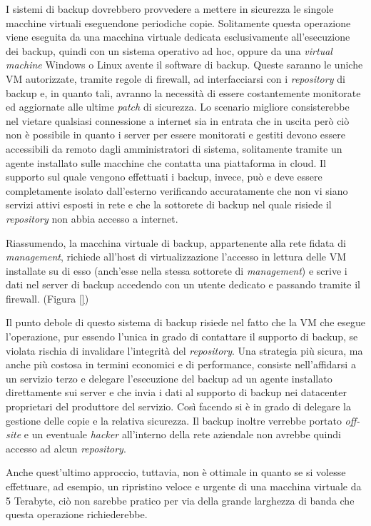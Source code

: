 \documentclass[target=bach,aauheader=]{thud}
\begin{document}
I sistemi di backup dovrebbero provvedere a mettere in sicurezza le singole macchine virtuali eseguendone periodiche copie. Solitamente questa operazione viene eseguita da una macchina virtuale dedicata esclusivamente all'esecuzione dei backup, quindi con un sistema operativo ad hoc, oppure da una \textit{virtual machine} Windows o Linux avente il software di backup. Queste saranno le uniche VM autorizzate, tramite regole di firewall, ad interfacciarsi con i \textit{repository} di backup e, in quanto tali, avranno la necessità di essere costantemente monitorate ed aggiornate alle ultime \textit{patch} di sicurezza. Lo scenario migliore consisterebbe nel vietare qualsiasi connessione a internet sia in entrata che in uscita però ciò non è possibile in quanto i server per essere monitorati e gestiti devono essere accessibili da remoto dagli amministratori di sistema, solitamente tramite un agente installato sulle macchine che contatta una piattaforma in cloud. Il supporto sul quale vengono effettuati i backup, invece, può e deve essere completamente isolato dall'esterno verificando accuratamente che non vi siano servizi attivi esposti in rete e che la sottorete di backup nel quale risiede il \textit{repository} non abbia accesso a internet.

Riassumendo, la macchina virtuale di backup, appartenente alla rete fidata di \textit{management}, richiede all'host di virtualizzazione l'accesso in lettura delle VM installate su di esso (anch'esse nella stessa sottorete di \textit{management}) e scrive i dati nel server di backup accedendo con un utente dedicato e passando tramite il firewall. (Figura \ref{})



Il punto debole di questo sistema di backup risiede nel fatto che la VM che esegue l'operazione, pur essendo l'unica in grado di contattare il supporto di backup, se violata rischia di invalidare l'integrità del \textit{repository}. Una strategia più sicura, ma anche più costosa in termini economici e di performance, consiste nell'affidarsi a un servizio terzo e delegare l'esecuzione del backup ad un agente installato direttamente sui server e che invia i dati al supporto di backup nei datacenter proprietari del produttore del servizio. Così facendo si è in grado di delegare la gestione delle copie e la relativa sicurezza. Il backup inoltre verrebbe portato \textit{off-site} e un eventuale \textit{hacker} all'interno della rete aziendale non avrebbe quindi accesso ad alcun \textit{repository}.

Anche quest'ultimo approccio, tuttavia, non è ottimale in quanto se si volesse effettuare, ad esempio, un ripristino veloce e urgente di una macchina virtuale da 5 Terabyte, ciò non sarebbe pratico per via della grande larghezza di banda che questa operazione richiederebbe.
\end{document}
